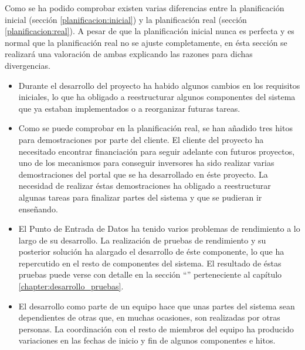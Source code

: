 Como se ha podido comprobar existen varias diferencias entre la planificación inicial (sección \ref{planificacion:inicial}) y la planificación real (sección \ref{planificacion:real}).  A pesar de que la planificación inicial nunca es perfecta y es normal que la planificación real no se ajuste completamente, en ésta sección se realizará una valoración de ambas explicando las razones para dichas divergencias.

\begin{itemize}
	\item
		Durante el desarrollo del proyecto ha habido algunos cambios en los requisitos iniciales, lo que ha obligado a reestructurar algunos componentes del sistema que ya estaban implementados o a reorganizar futuras tareas.
	\item
		Como se puede comprobar en la planificación real, se han añadido tres hitos para demostraciones por parte del cliente.  El cliente del proyecto ha necesitado encontrar financiación para seguir adelante con futuros proyectos, uno de los mecanismos para conseguir inversores ha sido realizar varias demostraciones del portal que se ha desarrollado en éste proyecto.  La necesidad de realizar éstas demostraciones ha obligado a reestructurar algunas tareas para finalizar partes del sistema y que se pudieran ir enseñando.
	\item
		El Punto de Entrada de Datos ha tenido varios problemas de rendimiento a lo largo de su desarrollo.  La realización de pruebas de rendimiento y su posterior solución ha alargado el desarrollo de éste componente, lo que ha repercutido en el resto de componentes del sistema.  El resultado de éstas pruebas puede verse con detalle en la sección ``'' perteneciente al capítulo \ref{chapter:desarrollo_pruebas}.
	\item
		El desarrollo como parte de un equipo hace que unas partes del sistema sean dependientes de otras que, en muchas ocasiones, son realizadas por otras personas.  La coordinación con el resto de miembros del equipo ha producido variaciones en las fechas de inicio y fin de algunos componentes e hitos.
\end{itemize}